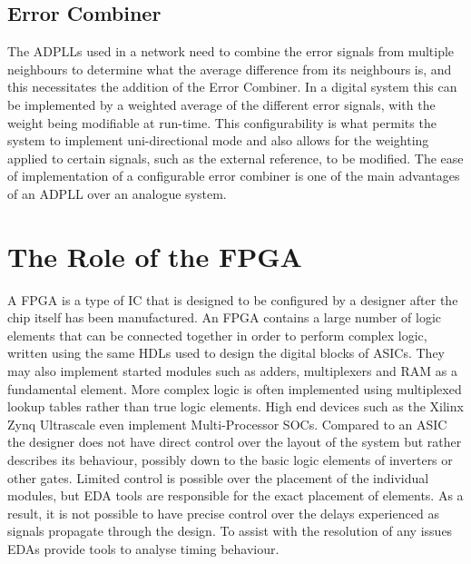 \subsection{Error Combiner}
The \ac{ADPLL}s used in a network need to combine the error signals from multiple neighbours to determine what the average difference from its neighbours is, and this necessitates the addition of the Error Combiner. In a digital system this can be implemented by a weighted average of the different error signals, with the weight being modifiable at run-time. This configurability is what permits the system to implement uni-directional mode and also allows for the weighting applied to certain signals, such as the external reference, to be modified. The ease of implementation of a configurable error combiner is one of the main advantages of an \ac{ADPLL} over an analogue system.

\section{The Role of the FPGA}
A \acl{FPGA} is a type of \ac{IC} that is designed to be configured by a designer after the chip itself has been manufactured. An \ac{FPGA} contains a large number of logic elements that can be connected together in order to perform complex logic, written using the same \ac{HDL}s used to design the digital blocks of \ac{ASIC}s. They may also implement started modules such as adders, multiplexers and \ac{RAM} as a fundamental element. More complex logic is often implemented using multiplexed lookup tables rather than true logic elements. High end devices such as the Xilinx Zynq Ultrascale even implement Multi-Processor \ac{SOC}s. Compared to an \ac{ASIC} the designer does not have direct control over the layout of the system but rather describes its behaviour, possibly down to the basic logic elements of inverters or other gates. Limited control is possible over the placement of the individual modules, but \ac{EDA} tools are responsible for the exact placement of elements. As a result, it is not possible to have precise control over the delays experienced as signals propagate through the design. To assist with the resolution of any issues \ac{EDA}s provide tools to analyse timing behaviour.

